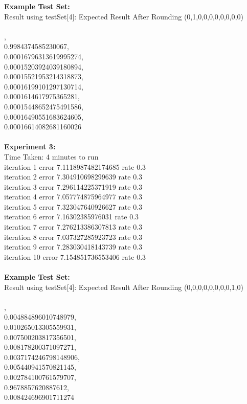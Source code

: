 \documentclass[11pt]{article}
\begin{document}
\begin{page}
\noindent \textbf{Example Test Set:}\\
Result using testSet[4]: Expected Result After Rounding (0,1,0,0,0,0,0,0,0,0)\\\\

,\\
  0.9984374585230067,\\
  0.00016796313619995274,\\
  0.00015203924039180894,\\
  0.00015521953214318873,\\
  0.00016199101297130714,\\
  0.0001614617975365281,\\
  0.00015448652475491586,\\
  0.00016490551683624605,\\
  0.00016614082681160026\\\\

\noindent \textbf{Experiment 3:} \\
Time Taken: 4 minutes to run\\

\noindent iteration 1 error 7.1118987482174685 rate 0.3\\
iteration 2 error 7.304910698299639 rate 0.3\\
iteration 3 error 7.296114225371919 rate 0.3\\
iteration 4 error 7.057774875964977 rate 0.3\\
iteration 5 error 7.323047640926627 rate 0.3\\
iteration 6 error 7.16302385976031 rate 0.3\\
iteration 7 error 7.276213386307813 rate 0.3\\
iteration 8 error 7.037327285923723 rate 0.3\\
iteration 9 error 7.283030418143739 rate 0.3\\
iteration 10 error 7.154851736553406 rate 0.3\\\\

\noindent \textbf{Example Test Set:}\\
Result using testSet[4]: Expected Result After Rounding (0,0,0,0,0,0,0,0,1,0)\\\\

,\\
  0.004884896010748979,\\
  0.010265013305559931,\\
  0.007500203817356501,\\
  0.008178200371097271,\\
  0.0037174246798148906,\\
  0.005440941570821145,\\
  0.002784100761579707,\\
  0.9678857620887612,\\
  0.008424696901711274\\


\end{page}
\end{document}
